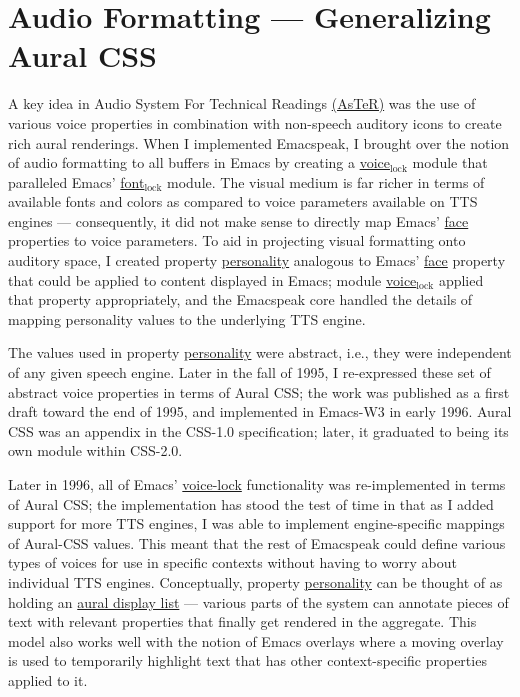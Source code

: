 \documentclass[11pt]{article}
\begin{document}
\section{Audio Formatting —  Generalizing Aural CSS}
\label{sec-8}


A key idea in Audio System For Technical Readings
\href{http://www.cs.cornell.edu/home/raman/aster/aster-toplevel.html}{(AsTeR)}
was the use of various voice properties in combination with
non-speech auditory icons to create rich aural renderings. When I
implemented Emacspeak, I brought over the notion of audio
formatting to all buffers in Emacs by creating a \uline{voice$_{\text{lock}}$}
module that paralleled Emacs' \uline{font$_{\text{lock}}$} module. The visual
medium is far richer in terms of available fonts and colors as
compared to voice parameters available on TTS engines —
consequently, it did not make sense to directly map Emacs' \uline{face}
properties to voice parameters. To aid in projecting visual
formatting onto auditory space, I created property \uline{personality}
analogous to Emacs' \uline{face} property that could be applied to
content displayed in Emacs; module \uline{voice$_{\text{lock}}$} applied that
property appropriately, and the Emacspeak core handled the
details of mapping personality values to the underlying TTS
engine.

The values used in property \uline{personality} were abstract, i.e.,
they were independent of any given speech engine. Later in the
fall of 1995, I re-expressed these set of abstract voice
properties in terms of Aural CSS; the work was published as a
first draft toward the end of 1995, and implemented in Emacs-W3
in early 1996. Aural CSS was an appendix in the CSS-1.0
specification; later, it graduated to being its own module within
CSS-2.0.

Later in 1996, all of Emacs' \uline{voice-lock} functionality was
re-implemented in terms of Aural CSS; the implementation has
stood the test of time in that as I added support for more TTS
engines, I was able to implement engine-specific mappings of
Aural-CSS values. This meant that the rest of Emacspeak could
define various types of voices for use in specific contexts
without having to worry about individual TTS
engines. Conceptually, property \uline{personality} can be thought of
as holding an \uline{aural display list} — various parts of the system
can annotate pieces of text with relevant properties that finally
get rendered in the aggregate. This model also works well with
the notion of Emacs overlays where a moving overlay is used to
temporarily highlight text that has other context-specific
properties applied to it.
\end{document}
